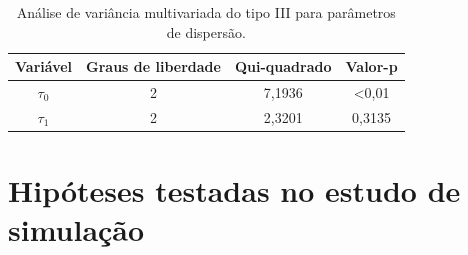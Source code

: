 \documentclass[AMA,STIX1COL]{WileyNJD-v2}
\begin{document}
\begin{table}[H]
\centering
\begin{tabular}{cccc}
\hline
Variável               & Graus de liberdade & Qui-quadrado & Valor-p        \\ \hline
$\tau_0$ & 2                  & 7,1936       & \textless 0,01 \\
$\tau_1$ & 2                  & 2,3201       & 0,3135         \\ \hline
\end{tabular}
\caption{Análise de variância multivariada do tipo III para parâmetros de dispersão.}
\label{tab8}
\end{table}

\appendix

\section{Hipóteses testadas no estudo de simulação\label{app1}}

\end{document}
